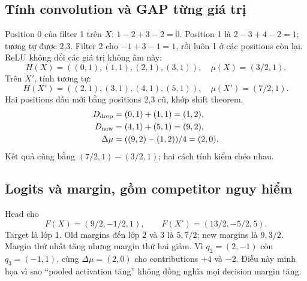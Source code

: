 \documentclass[11pt,a4paper]{article}
\theoremstyle{definition}
\begin{document}
\subsection{Tính convolution và GAP từng giá trị}
Position 0 của filter 1 trên $X$: $1-2+3-2=0$. Position 1 là
$2-3+4-2=1$; tương tự được 2,3. Filter 2 cho
$-1+3-1=1$, rồi luôn 1 ở các positions còn lại. ReLU không đổi các giá trị
không âm này:
\begin{equation}
H(X)=((0,1),(1,1),(2,1),(3,1)),\quad\mu(X)=(3/2,1).
\end{equation}
Trên $X'$, tính tương tự:
\begin{equation}
H(X')=((2,1),(3,1),(4,1),(5,1)),\quad\mu(X')=(7/2,1).
\end{equation}
Hai positions đầu mới bằng positions 2,3 cũ, khớp shift theorem.
\begin{align}
D_{\rm drop}&=(0,1)+(1,1)=(1,2),\\
D_{\rm new}&=(4,1)+(5,1)=(9,2),\\
\Delta\mu&=((9,2)-(1,2))/4=(2,0).
\end{align}
Kết quả cũng bằng $(7/2,1)-(3/2,1)$; hai cách tính kiểm chéo nhau.

\subsection{Logits và margin, gồm competitor nguy hiểm}
Head cho
\begin{equation}
F(X)=(9/2,-1/2,1),\qquad F(X')=(13/2,-5/2,5).
\end{equation}
Target là lớp 1. Old margins đến lớp 2 và 3 là $5,7/2$; new margins
là $9,3/2$. Margin thứ nhất tăng nhưng margin thứ hai giảm. Vì
$q_2=(2,-1)$ còn $q_3=(-1,1)$, cùng $\Delta\mu=(2,0)$ cho contributions
$+4$ và $-2$. Điều này minh họa vì sao ``pooled activation tăng'' không
đồng nghĩa mọi decision margin tăng.
\end{document}
